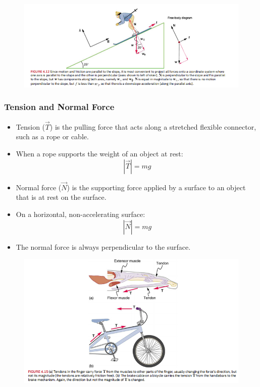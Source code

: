 \documentclass{beamer}
\begin{document}
\begin{frame}
\begin{figure}
    \centering
    \includegraphics[width=1.0\linewidth]{CH4/Screenshot 2024-10-21 152424.png}
\end{figure}
\end{frame}
\begin{frame}
\frametitle{Tension and Normal Force}
\begin{itemize}
    \item Tension ($\vec{T}$) is the pulling force that acts along a stretched flexible connector, such as a rope or cable.
    \item When a rope supports the weight of an object at rest:
    \[|\vec{T}| = mg\]
    \item Normal force ($\vec{N}$) is the supporting force applied by a surface to an object that is at rest on the surface.
    \item On a horizontal, non-accelerating surface:
    \[|\vec{N}| = mg\]
    \item The normal force is always perpendicular to the surface.
\end{itemize}
\end{frame}

\begin{frame}
\begin{figure}
    \centering
    \includegraphics[width=1\linewidth]{CH4/Screenshot 2024-10-21 152741.png}
\end{figure}
\end{frame}
\end{document}
